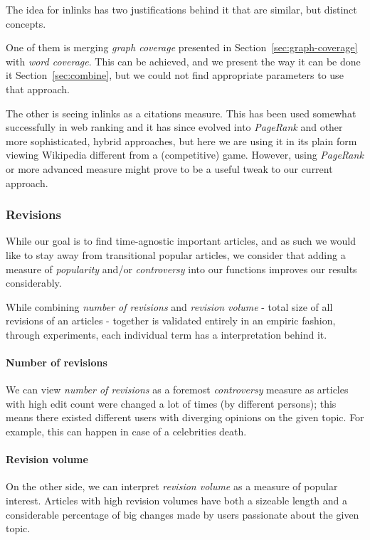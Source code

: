 The idea for inlinks has two justifications behind it that are similar, but
distinct concepts.

One of them is merging \emph{graph coverage} presented in
Section~\ref{sec:graph-coverage} with \emph{word coverage}.
This can be achieved, and we present the way it can be done it
Section~\ref{sec:combine}, but we could not find appropriate parameters to use
that approach.

The other is seeing inlinks as a citations measure.
This has been used somewhat successfully in web ranking and it has since
evolved into \emph{PageRank} and other more sophisticated, hybrid approaches,
but here we are using it in its plain form viewing Wikipedia different from a
(competitive) game.
However, using \emph{PageRank} or more advanced measure might prove to be a
useful tweak to our current approach.

\subsubsection{Revisions}

While our goal is to find time-agnostic important articles, and as such we
would like to stay away from transitional popular articles, we consider that
adding a measure of \emph{popularity} and/or \emph{controversy} into our
functions improves our results considerably.

While combining \emph{number of revisions} and \emph{revision volume} - total
size of all revisions of an articles - together is validated entirely in an
empiric fashion, through experiments, each individual term has a interpretation
behind it.

\paragraph{Number of revisions}
We can view \emph{number of revisions} as a foremost \emph{controversy} measure
as articles with high edit count were changed a lot of times (by different
persons); this means there existed different users with diverging opinions on
the given topic. For example, this can happen in case of a celebrities death.

\paragraph{Revision volume}
On the other side, we can interpret \emph{revision volume} as a measure of
popular interest. Articles with high revision volumes have both a sizeable
length and a considerable percentage of big changes made by users passionate
about the given topic.

